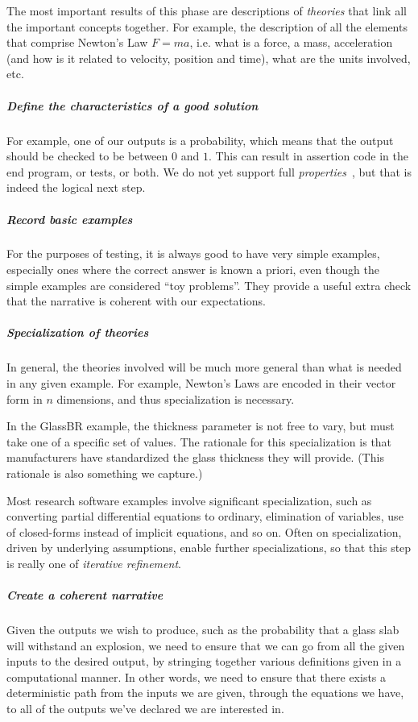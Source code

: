 \documentclass[a4paper,UKenglish,cleveref,autoref,thm-restate]{oasics-v2021}
\begin{document}
The most important results of this phase are descriptions of \emph{theories}
that link all the important concepts together. For example, the description
of all the elements that comprise Newton's Law $F = m a$,
i.e. what is a force, a mass, acceleration (and how is it related to
velocity, position and time), what are the units involved, etc.

\subparagraph*{Define the characteristics of a good solution}
For example, one of our outputs is a probability, which means that the output
should be checked to be between \(0\) and \(1\). This can result
in assertion code in the end program, or tests, or both. We do not yet
support full \emph{properties}~\cite{claessen2000quickcheck}, but that is
indeed the logical next step.

\subparagraph*{Record basic examples}
For the purposes of testing, it is always good to have very simple examples,
especially ones where the correct answer is known a priori, even though the simple
examples are considered ``toy problems''. They provide a useful extra check
that the narrative is coherent with our expectations.

\subparagraph*{Specialization of theories}
In general, the theories involved will be much more general than what is
needed in any given example. For example, Newton's Laws are encoded in their
vector form in $n$ dimensions, and thus specialization is necessary.

In the GlassBR example, the thickness parameter
is not free to vary, but must take one of a specific set of values. The
rationale for this specialization is that manufacturers have standardized the
glass thickness they will provide. (This rationale is also something we capture.)

Most research software examples involve significant specialization, such as
converting partial differential equations to ordinary, elimination of
variables, use of closed-forms instead of implicit equations, and so on.
Often on specialization, driven by underlying assumptions, enable further
specializations, so that this step is really one of \emph{iterative refinement}.

\subparagraph*{Create a coherent narrative}
Given the outputs we wish to produce, such as the probability that a glass
slab will withstand an explosion, we need to ensure that we can go from all
the given inputs to the desired output, by stringing together various
definitions given in a computational manner. In other words, we need to
ensure that there exists a deterministic path from the inputs we are given,
through the equations we have, to all of the outputs we've declared we are
interested in.
\end{document}
